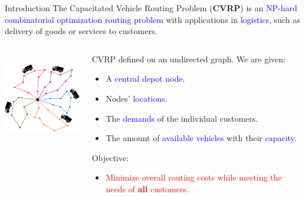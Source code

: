 \begin{frame}{Introduction}
	The Capacitated Vehicle Routing Problem (\textbf{CVRP}) \parencite{dantzig1959}
	is an \textcolor{blue}{NP-hard combinatorial optimization routing problem} with applications in \textcolor{blue}{logistics}, such as delivery of goods or services to customers.

	\vspace{0.3cm}

	\begin{columns}
		\begin{column}{.35\textwidth}
			\centering
			\includegraphics[height=4cm]{Imgs/CVRP-example.cropped.pdf}
		\end{column}
		\begin{column}{.65\textwidth}
			CVRP defined on an undirected graph. We are given:
			\begin{itemize}
				\item A \textcolor{blue}{central depot node}.
				\item Nodes' \textcolor{blue}{locations}.
				\item The \textcolor{blue}{demands} of the individual customers.
				\item The amount of \textcolor{blue}{available vehicles} with their \textcolor{blue}{capacity}.
			\end{itemize}
			Objective:
			\begin{itemize}
				\item \textcolor{red}{Minimize overall routing costs while meeting the needs of \textbf{all} customers.}
			\end{itemize}
		\end{column}
	\end{columns}

\end{frame}

